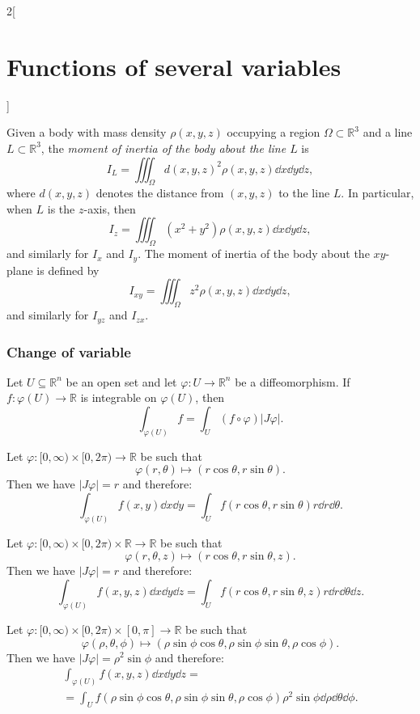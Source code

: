 \documentclass[../../../main.tex]{subfiles}
\begin{document}
\begin{multicols}{2}[\section{Functions of several variables}]
\begin{definition}
\end{definition}
\begin{definition}
Given a body with mass density $\rho(x,y,z)$ occupying a region $\Omega\subset\mathbb{R}^3$ and a line $L\subset\mathbb{R}^3$, the \textit{moment of inertia of the body about the line $L$} is $$I_L=\iiint_\Omega d(x,y,z)^2\rho(x,y,z)\dd x\dd y\dd z,$$ where $d(x,y,z)$ denotes the distance from $(x,y,z)$ to the line $L$. In particular, when $L$ is the $z$-axis, then $$I_z=\iiint_\Omega (x^2+y^2)\rho(x,y,z)\dd x\dd y\dd z,$$ and similarly for $I_x$ and $I_y$. The moment of inertia of the body about the $xy$-plane is defined by $$I_{xy}=\iiint_\Omega z^2\rho(x,y,z)\dd x\dd y\dd z,$$ and similarly for $I_{yz}$ and $I_{zx}.$
\end{definition}
\subsubsection*{Change of variable}
\begin{theorem}
Let $U\subseteq\mathbb{R}^n$ be an open set and let $\varphi:U\rightarrow\mathbb{R}^n$ be a diffeomorphism. If $f:\varphi(U)\rightarrow\mathbb{R}$ is integrable on $\varphi(U)$, then $$\int_{\varphi(U)} f=\int_U(f\circ\varphi)|J\varphi|.$$
\end{theorem}
\begin{corollary}
Let $\varphi:[0,\infty)\times[0,2\pi)\rightarrow\mathbb{R}$ be such that
$$\varphi(r,\theta)\longmapsto(r\cos\theta,r\sin\theta).$$
Then we have $|J\varphi|=r$ and therefore: $$\int_{\varphi(U)}f(x,y)\dd x\dd y=\int_Uf(r\cos\theta,r\sin\theta)r\dd r \dd\theta.$$
\end{corollary}
\begin{corollary}
Let $\varphi:[0,\infty)\times[0,2\pi)\times\mathbb{R}\rightarrow\mathbb{R}$ be such that $$\varphi(r,\theta,z)\longmapsto(r\cos\theta,r\sin\theta,z).$$
Then we have $|J\varphi|=r$ and therefore: $$\int_{\varphi(U)}f(x,y,z)\dd x\dd y\dd z=\int_Uf(r\cos\theta,r\sin\theta,z)r\dd r \dd\theta \dd z.$$
\end{corollary}
\begin{corollary}
Let $\varphi:[0,\infty)\times[0,2\pi)\times[0,\pi]\rightarrow\mathbb{R}$ be such that $$\varphi(\rho,\theta,\phi)\longmapsto(\rho\sin\phi\cos\theta,\rho\sin\phi\sin\theta,\rho\cos\phi).$$
Then we have $|J\varphi|=\rho^2\sin\phi$ and therefore:
\begin{multline*}
    \int_{\varphi(U)}f(x,y,z)\dd x\dd y\dd z=\\=\int_Uf(\rho\sin\phi\cos\theta,\rho\sin\phi\sin\theta,\rho\cos\phi)\rho^2\sin\phi \dd \rho \dd \theta \dd \phi.
\end{multline*}
\end{corollary}

\end{multicols}
\end{document}
